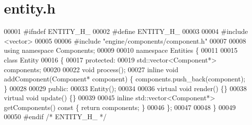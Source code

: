 \section{entity.\+h}
\label{entity_8h_source}

\begin{DoxyCode}
00001 \textcolor{preprocessor}{#ifndef ENTITY\_H\_}
00002 \textcolor{preprocessor}{#define ENTITY\_H\_}
00003 
00004 \textcolor{preprocessor}{#include <vector>}
00005 
00006 \textcolor{preprocessor}{#include "engine/components/component.h"}
00007 
00008 \textcolor{keyword}{using namespace }Components;
00009 
00010 \textcolor{keyword}{namespace }Entities \{
00011     
00015     \textcolor{keyword}{class }Entity
00016     \{
00017     \textcolor{keyword}{protected}:
00019         std::vector<Component*> components;
00020 
00022         \textcolor{keywordtype}{void} process();
00027         \textcolor{keyword}{inline} \textcolor{keywordtype}{void} addComponent(Component* component) \{ components.push\_back(component); \}
00028 
00029     \textcolor{keyword}{public}:
00033         Entity();
00034 
00036         \textcolor{keyword}{virtual} \textcolor{keywordtype}{void} render() \{\}
00038         \textcolor{keyword}{virtual} \textcolor{keywordtype}{void} update() \{\}
00039 
00045         \textcolor{keyword}{inline} std::vector<Component*> getComponents()\textcolor{keyword}{ const }\{ \textcolor{keywordflow}{return} components; \}
00046     \};
00047 
00048 \}
00049 
00050 \textcolor{preprocessor}{#endif }\textcolor{comment}{/* ENTITY\_H\_ */}\textcolor{preprocessor}{}
\end{DoxyCode}
